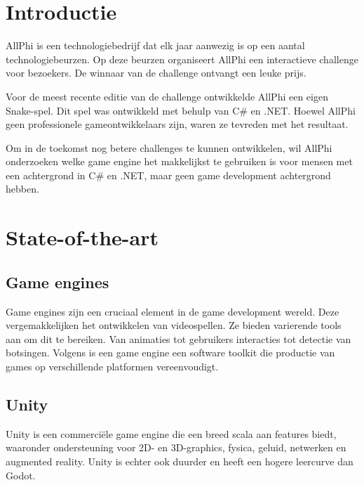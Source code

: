 
\section{Introductie}%
\label{sec:introductie}

AllPhi is een technologiebedrijf dat elk jaar aanwezig is op een aantal technologiebeurzen. Op deze beurzen organiseert AllPhi een interactieve challenge voor bezoekers. De winnaar van de challenge ontvangt een leuke prijs.

Voor de meest recente editie van de challenge ontwikkelde AllPhi een eigen Snake-spel. Dit spel was ontwikkeld met behulp van C\# en .NET. Hoewel AllPhi geen professionele gameontwikkelaars zijn, waren ze tevreden met het resultaat.

Om in de toekomst nog betere challenges te kunnen ontwikkelen, wil AllPhi onderzoeken welke game engine het makkelijkst te gebruiken is voor mensen met een achtergrond in C\# en .NET, maar geen game development achtergrond hebben.



\section{State-of-the-art}%
\label{sec:state-of-the-art}
\subsection{Game engines}
Game engines zijn een cruciaal element in de game development wereld. Deze vergemakkelijken het ontwikkelen van videospellen. Ze bieden varierende tools aan om dit te bereiken. Van animaties tot gebruikers interacties tot detectie van botsingen. Volgens \textcite{Barczak2021} is een game engine een software toolkit die productie van games op verschillende platformen vereenvoudigt.

\subsection{Unity}
Unity is een commerciële game engine die een breed scala aan features biedt, waaronder ondersteuning voor 2D- en 3D-graphics, fysica, geluid, netwerken en augmented reality.\autocite{Haas2014} Unity is echter ook duurder en heeft een hogere leercurve dan Godot.

